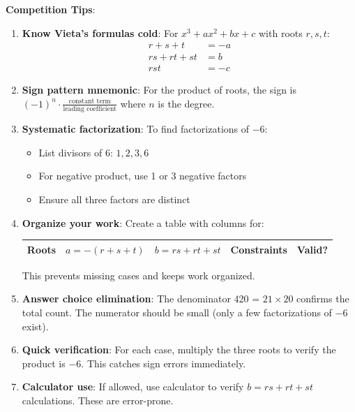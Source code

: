 \documentclass[12pt]{article}
\begin{document}
\begin{tipbox}
\textbf{Competition Tips}:

\begin{enumerate}
    \item \textbf{Know Vieta's formulas cold}: For $x^3 + ax^2 + bx + c$ with roots $r, s, t$:
    \begin{align*}
        r + s + t &= -a \\
        rs + rt + st &= b \\
        rst &= -c
    \end{align*}
    
    \item \textbf{Sign pattern mnemonic}: For the product of roots, the sign is $(-1)^n \cdot \frac{\text{constant term}}{\text{leading coefficient}}$ where $n$ is the degree.
    
    \item \textbf{Systematic factorization}: To find factorizations of $-6$:
    \begin{itemize}
        \item List divisors of 6: $1, 2, 3, 6$
        \item For negative product, use 1 or 3 negative factors
        \item Ensure all three factors are distinct
    \end{itemize}
    
    \item \textbf{Organize your work}: Create a table with columns for:
    \begin{center}
    \begin{tabular}{|c|c|c|c|c|}
    \hline
    Roots & $a = -(r+s+t)$ & $b = rs+rt+st$ & Constraints & Valid? \\
    \hline
    \end{tabular}
    \end{center}
    This prevents missing cases and keeps work organized.
    
    \item \textbf{Answer choice elimination}: The denominator 420 = $21 \times 20$ confirms the total count. The numerator should be small (only a few factorizations of $-6$ exist).
    
    \item \textbf{Quick verification}: For each case, multiply the three roots to verify the product is $-6$. This catches sign errors immediately.
    
    \item \textbf{Calculator use}: If allowed, use calculator to verify $b = rs + rt + st$ calculations. These are error-prone.
\end{enumerate}
\end{tipbox}
\end{document}
